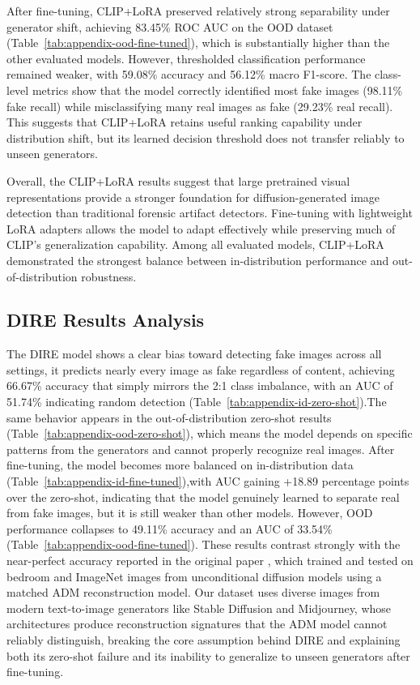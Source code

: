 After fine-tuning, CLIP+LoRA preserved relatively strong separability under generator shift, achieving 83.45\% ROC AUC on the OOD dataset (Table~\ref{tab:appendix-ood-fine-tuned}), which is substantially higher than the other evaluated models. However, thresholded classification performance remained weaker, with 59.08\% accuracy and 56.12\% macro F1-score. The class-level metrics show that the model correctly identified most fake images (98.11\% fake recall) while misclassifying many real images as fake (29.23\% real recall). This suggests that CLIP+LoRA retains useful ranking capability under distribution shift, but its learned decision threshold does not transfer reliably to unseen generators.

Overall, the CLIP+LoRA results suggest that large pretrained visual representations provide a stronger foundation for diffusion-generated image detection than traditional forensic artifact detectors. Fine-tuning with lightweight LoRA adapters allows the model to adapt effectively while preserving much of CLIP's generalization capability. Among all evaluated models, CLIP+LoRA demonstrated the strongest balance between in-distribution performance and out-of-distribution robustness.


\subsection{DIRE Results Analysis}
The DIRE model shows a clear bias toward detecting fake images across all settings, it predicts nearly every image as fake regardless of content, achieving 66.67\% accuracy that simply mirrors the 2:1 class imbalance, with an AUC of 51.74\% indicating random detection (Table~\ref{tab:appendix-id-zero-shot}).The same behavior appears in the out-of-distribution zero-shot results (Table~\ref{tab:appendix-ood-zero-shot}), which means the model depends on specific patterns from the generators and cannot properly recognize real images. 
After fine-tuning, the model becomes more balanced on in-distribution data (Table~\ref{tab:appendix-id-fine-tuned}),with AUC gaining +18.89 percentage points over the zero-shot, indicating that the model genuinely learned to separate real from fake images, but it is still weaker than other models.  
However, OOD performance collapses to 49.11\% accuracy and an AUC of 33.54\% (Table~\ref{tab:appendix-ood-fine-tuned}). These results contrast strongly with the near-perfect accuracy reported in the original paper \cite{wang2023dire}, which trained and tested on bedroom and ImageNet images from unconditional diffusion models using a matched ADM reconstruction model. Our dataset uses diverse images from modern text-to-image generators like Stable Diffusion and Midjourney, whose architectures produce reconstruction signatures that the ADM model cannot reliably distinguish, breaking the core assumption behind DIRE and explaining both its zero-shot failure and its inability to generalize to unseen generators after fine-tuning. 

